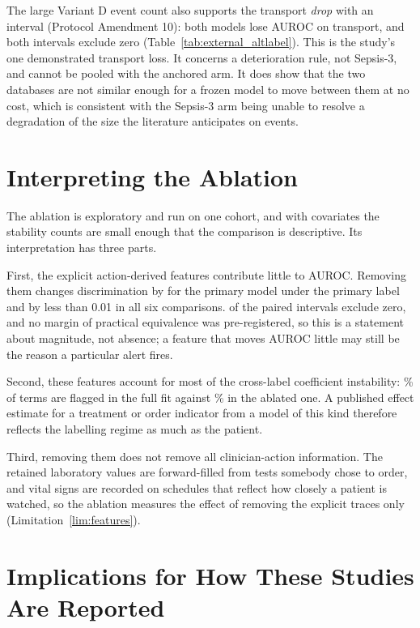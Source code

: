 The large Variant D event count also supports the transport \emph{drop} with
an interval (Protocol Amendment 10): both models lose AUROC on transport, and
both intervals exclude zero (Table~\ref{tab:external_altlabel}). This is the
study's one demonstrated transport loss. It concerns a deterioration rule, not
Sepsis-3, and cannot be pooled with the anchored arm. It does show that the two
databases are not similar enough for a frozen model to move between them at no
cost, which is consistent with the Sepsis-3 arm being unable to resolve a
degradation of the size the literature anticipates on \pcExtNEventsB{} events.


\section{Interpreting the Ablation}
\label{sec:ablation_establishes}

The ablation is exploratory and run on one cohort, and with \pcHTwoNTerms{}
covariates the stability counts are small enough that the comparison is
descriptive. Its interpretation has three parts.

First, the explicit action-derived features contribute little to AUROC.
Removing them changes discrimination by \pcAblDeltaAurocPrimaryB{} for the
primary model under the primary label and by less than 0.01 in all six
comparisons. \pcAblNExcludeZero{} of the \pcAblNContrasts{} paired intervals
exclude zero, and no margin of practical equivalence was pre-registered, so
this is a statement about magnitude, not absence; a feature that moves AUROC
little may still be the reason a particular alert fires.

Second, these features account for most of the cross-label coefficient
instability: \pcHTwoPctUnstable\% of terms are flagged in the full fit against
\pcAblHTwoPctUnstable\% in the ablated one. A published effect estimate for a
treatment or order indicator from a model of this kind therefore reflects the
labelling regime as much as the patient.

Third, removing them does not remove all clinician-action information. The
retained laboratory values are forward-filled from tests somebody chose to
order, and vital signs are recorded on schedules that reflect how closely a
patient is watched, so the ablation measures the effect of removing the
explicit traces only (Limitation~\ref{lim:features}).


\section{Implications for How These Studies Are Reported}
\label{sec:implications}

